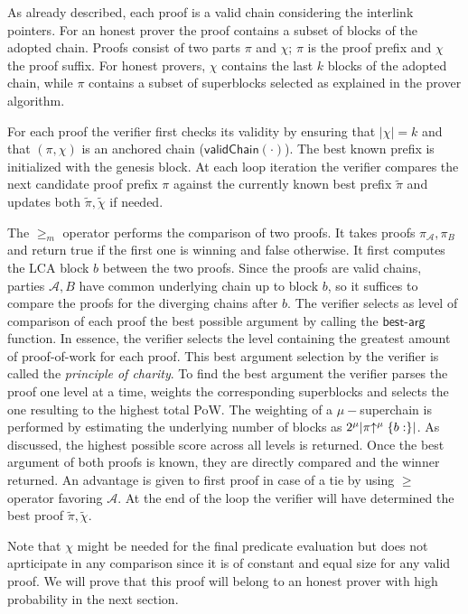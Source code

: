 As already described, each proof is a  valid chain considering the interlink pointers. For an honest prover the proof contains a subset of blocks of the adopted chain. Proofs consist of two parts $\pi$ and $\chi$; $\pi$ is the proof prefix and $\chi$ the proof suffix. For honest provers, $\chi$ contains the last $k$ blocks of the adopted chain, while $\pi$ contains a subset of superblocks selected as explained in the prover algorithm.

For each proof the verifier first checks its validity by ensuring that $\lvert \chi \rvert = k$ and that $(\pi, \chi)$ is an anchored chain ($\mathsf{validChain(\cdot)}$). The best known prefix is initialized with the genesis block. At each loop iteration the verifier compares the next candidate proof prefix $\pi$ against the currently known best prefix $\tilde{\pi}$ and updates both $\tilde{\pi}, \tilde{\chi}$ if needed. 

The $\geq_m$ operator performs the comparison of two proofs. It takes proofs $\pi_\mathcal{A}, \pi_B$ and return true if the first one is winning and false otherwise. It first computes the LCA block $b$ between the two proofs. Since the proofs are valid chains, parties $\mathcal{A}, B$ have common underlying chain up to block $b$, so it suffices to compare the proofs for the diverging chains after $b$. The verifier selects as level of comparison of each proof the best possible argument by calling the $\mathsf{best\text{-}arg}$ function. In essence, the verifier selects the level containing the greatest amount of proof-of-work for each proof. This best argument selection by the verifier is called the \emph{principle of charity}. To find the best argument the verifier parses the proof one level at a time, weights the corresponding superblocks and selects the one resulting to the highest total PoW. The weighting of a $\mu-$superchain is performed by estimating the underlying number of blocks as $2^\mu \lvert \pi \negthickspace\uparrow^\mu \{b:\} \rvert$. As discussed, the highest possible score across all levels is returned. Once the best argument of both proofs is known, they are directly compared and the winner returned. An advantage is given to first proof in case of a tie by using $\geq$ operator favoring $\mathcal{A}$. At the end of the loop the verifier will have determined the best proof $\tilde{\pi}, \tilde{\chi}$.

Note that $\chi$ might be needed for the final predicate evaluation but does not aprticipate in any comparison since it is of constant and equal size for any valid proof. We will prove that this proof will belong to an honest prover with high probability in the next section. 

